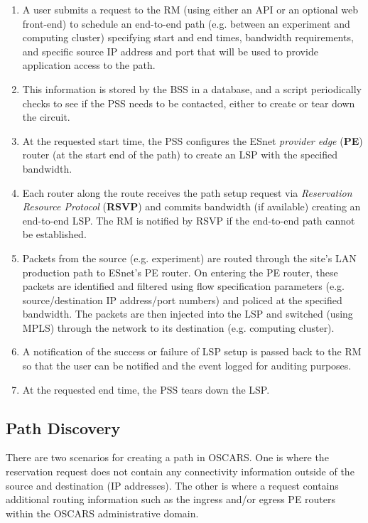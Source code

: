 \documentclass[conference]{IEEEtran}
\begin{document}
\begin{enumerate}
\item
A user submits a request to the RM (using either an API or
an optional web front-end) to schedule an end-to-end path (e.g. between an
experiment and computing cluster) specifying start and end times, bandwidth
requirements, and specific source IP address and port that will be used to     
provide application access to the path.

\item
This information is stored by the BSS in a database, and a script 
periodically checks to see if the PSS needs to be contacted, either to create 
or tear down the circuit.

\item
At the requested start time, the PSS configures the 
ESnet \emph{provider edge} (\textbf{PE}) router
(at the start end of the path) to create an LSP with the
specified bandwidth.

\item
Each router along the route receives the path setup request 
via \emph{Reservation Resource Protocol} (\textbf{RSVP})
and commits bandwidth (if available) creating an end-to-end LSP.  The RM is
notified by RSVP if the end-to-end path cannot be established.

\item
Packets from the source (e.g. experiment) are routed through the site's
LAN production path to ESnet's PE router.  On entering the PE router,
these packets are identified and filtered using flow specification parameters
(e.g. source/destination IP address/port numbers) and policed at the specified
bandwidth.  The packets are then injected into the LSP and switched (using MPLS)
through the network to its destination (e.g. computing cluster).

\item
A notification of the success or failure of LSP setup is 
passed back to the RM so that the user can be notified and the event 
logged for auditing purposes.

\item
At the requested end time, the PSS tears down the LSP.
\end{enumerate}

\subsection{Path Discovery}
There are two scenarios for creating a path in OSCARS.  One is where the
reservation request does not contain any connectivity information outside of
the source and destination (IP addresses).  The other is where a request
contains additional routing information such as the ingress and/or egress 
PE routers within the OSCARS administrative domain.
\end{document}
